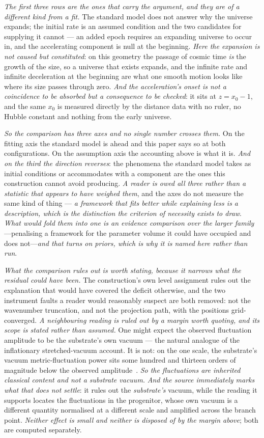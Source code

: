 \documentclass[11pt,a4paper]{article}
\theoremstyle{plain}
\theoremstyle{definition}
\begin{document}
\emph{The first three rows are the ones that carry the argument, and they are of a different kind from a
fit.} The standard model does not answer why the universe expands; the initial rate is an assumed condition
and the two candidates for supplying it cannot --- an added epoch requires an expanding universe to occur in,
and the accelerating component is null at the beginning. \emph{Here the expansion is not caused but
constituted}: on this geometry the passage of cosmic time \emph{is} the growth of the size, so a universe that
exists expands, and the infinite rate and infinite deceleration at the beginning are what one smooth motion
looks like where its size passes through zero. \emph{And the acceleration's onset is not a coincidence to be
absorbed but a consequence to be checked}: it sits at $z=x_0-1$, and the same $x_0$ is measured directly by
the distance data with no ruler, no Hubble constant and nothing from the early universe.

\emph{So the comparison has three axes and no single number crosses them.} On the fitting axis the standard
model is ahead and this paper says so at both configurations. On the assumption axis the accounting above is
what it is. \emph{And on the third the direction reverses}: the phenomena the standard model takes as initial
conditions or accommodates with a component are the ones this construction cannot avoid producing.
\emph{A reader is owed all three rather than a statistic that appears to have weighed them}, and the axes do
not measure the same kind of thing --- \emph{a framework that fits better while explaining less is a
description, which is the distinction the criterion of necessity exists to draw}.
\emph{What would fold them into one is an evidence comparison over the larger family}---penalising a framework
for the parameter volume it could have occupied and does not---\emph{and that turns on priors, which is why it
is named here rather than run}.

\emph{What the comparison rules out is worth stating, because it narrows what the residual could have been.} The construction's own level assignment
rules out the explanation that would have covered the deficit otherwise, and the two instrument faults a reader would reasonably
suspect are both removed: not the wavenumber truncation, and not the projection path, with the positions
grid-converged. \emph{A neighbouring reading is ruled out by a margin worth quoting, and its scope is stated rather than
assumed.} One might expect the observed fluctuation amplitude to be the substrate's own vacuum --- the
natural analogue of the inflationary stretched-vacuum account. It is not: on the one scale, the substrate's
vacuum metric-fluctuation power sits some hundred and thirteen orders of magnitude below the observed
amplitude~\cite{JanzenCRcosmology}. \emph{So the fluctuations are inherited classical content and not a
substrate vacuum.} \emph{And the source immediately marks what that does not settle}: it rules out the
\emph{substrate's} vacuum, while the reading it supports locates the fluctuations in the progenitor, whose
own vacuum is a different quantity normalised at a different scale and amplified across the branch point.
\emph{Neither effect is small and neither is disposed of by the margin above}; both are computed separately.
\end{document}
